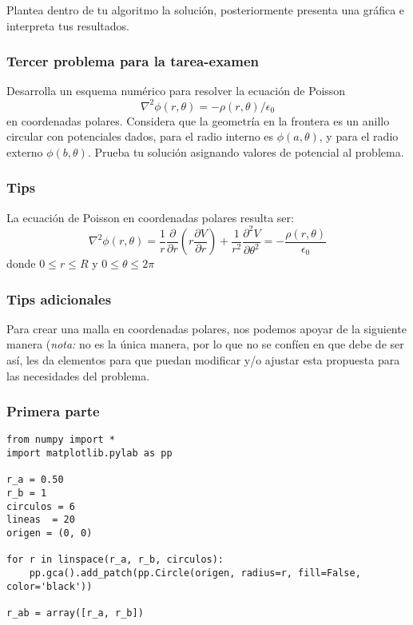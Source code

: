 \begin{frame}[fragile]
\begin{center}
\end{center}
Plantea dentro de tu algoritmo la solución, posteriormente presenta una gráfica e interpreta tus resultados.
\end{frame}
\begin{frame}
\frametitle{Tercer problema para la tarea-examen}
Desarrolla un esquema numérico para resolver la ecuación de Poisson
\[ \nabla^{2} \phi (r,\theta) = - \rho (r, \theta) / \epsilon_{0} \]
en coordenadas polares. Considera que la geometría en la frontera es un anillo circular con potenciales dados, para el radio interno es $\phi(a,\theta)$, y para el radio externo $\phi(b,\theta)$. Prueba tu solución asignando valores de potencial al problema.
\end{frame}
\begin{frame}
\frametitle{Tips}
La ecuación de Poisson en coordenadas polares resulta ser:
\[ \nabla^{2} \phi (r,\theta) = \dfrac{1}{r} \dfrac{\partial}{\partial r} \left( r \dfrac{\partial V}{\partial r} \right) + \dfrac{1}{r^{2}} \dfrac{\partial^{2} V}{\partial \theta^{2}} = - \dfrac{\rho(r,\theta)}{\epsilon_{0}} \]
donde $0 \leq r \leq R $ y $0 \leq \theta \leq 2 \pi$
\end{frame}
\begin{frame}[fragile]
\frametitle{Tips adicionales}
Para crear una malla en coordenadas polares, nos podemos apoyar de la siguiente manera (\emph{nota: } no es la única manera, por lo que no se confíen en que debe de ser así, les da elementos para que puedan modificar y/o ajustar esta propuesta para las necesidades del problema.
\end{frame}
\begin{frame}[fragile]
\frametitle{Primera parte}
\begin{lstlisting}
from numpy import *
import matplotlib.pylab as pp

r_a = 0.50
r_b = 1
circulos = 6  
lineas  = 20
origen = (0, 0)

for r in linspace(r_a, r_b, circulos):
    pp.gca().add_patch(pp.Circle(origen, radius=r, fill=False, color='black'))

r_ab = array([r_a, r_b])
\end{lstlisting}
\end{frame}
